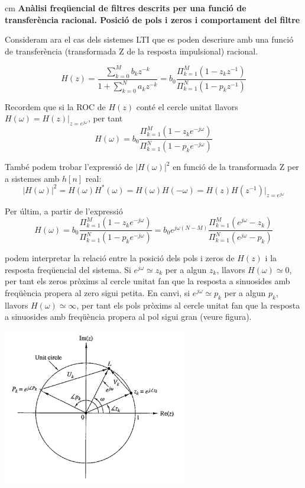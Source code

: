 \documentclass{article}
\begin{document}
 cm
\textbf{Anàlisi freqüencial de filtres descrits per una funció de transferència racional. Posició de pols i zeros i comportament del filtre}

Consideram ara el cas dels sistemes LTI que es poden descriure amb una funció de transferència
(transformada Z de la resposta impulsional) racional.

\[
H(z)=\frac{\sum_{k=0}^M b_k z^{-k}}{1+ \sum_{k=0}^N a_k z^{-k}}=
b_0 \frac{ \Pi_{k=1}^M (1-z_k z^{-1}) }{ \Pi_{k=1}^N (1-p_k z^{-1}) }
\]

Recordem que si la ROC de $H(z)$ conté el cercle unitat llavors $H(\omega)=H(z)|_{z=e^{j\omega}}$, per tant
\[
H(\omega)=b_0 \frac{ \Pi_{k=1}^M (1-z_k e^{-j\omega}) }{ \Pi_{k=1}^N (1-p_k e^{-j\omega}) }
\]

També podem trobar l'expressió de $|H(\omega)|^2$ en funció de la transformada Z per a sistemes amb $h[n]$ real:
\[
|H(\omega)|^2=H(\omega) H^*(\omega)=H(\omega) H(-\omega)=H(z) H(z^{-1})|_{z=e^{j\omega}}
\]


Per últim, a partir de l'expressió 
\[
H(\omega)=b_0 \frac{ \Pi_{k=1}^M (1-z_k e^{-j\omega}) }{ \Pi_{k=1}^N (1-p_k e^{-j\omega}) }=
b_0 e^{j \omega (N-M)} \frac{ \Pi_{k=1}^M (e^{j\omega}-z_k) }{ \Pi_{k=1}^N (e^{j\omega}-p_k) }
\]

podem interpretar la relació entre la posició dels pols i zeros de $H(z)$ i la resposta freqüencial
del sistema. Si $e^{j\omega} \simeq z_k$ per a algun $z_k$, llavors $H(\omega) \simeq 0$, per tant 
els zeros pròxims al cercle unitat fan que la resposta a sinuosides amb freqüència propera al zero
sigui petita. En canvi, si $e^{j\omega} \simeq p_k$ per a algun $p_k$, llavors $H(\omega) \simeq \infty$, per tant 
els pols pròxims al cercle unitat fan que la resposta a sinuosides amb freqüència propera al pol
sigui gran (veure figura).

\begin{center}
\includegraphics[width=8cm]{polszerosHomega.png}
\end{center}
\end{document}
